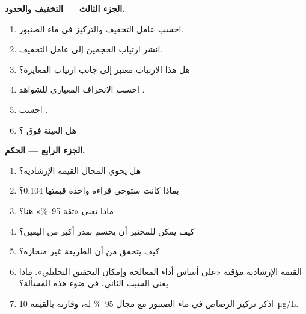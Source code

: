 \begin{problem}
\medskip
\noindent\textbf{الجزء الثالث --- التخفيف والحدود.}
\begin{enumerate}[resume]
  \item احسب عامل التخفيف والتركيز في ماء الصنبور.
  \item انشر ارتياب الحجمين إلى عامل التخفيف.
  \item هل هذا الارتياب معتبر إلى جانب ارتياب المعايرة؟
  \item احسب الانحراف المعياري للشواهد .
  \item احسب .
  \item هل العينة فوق ؟
\end{enumerate}

\medskip
\noindent\textbf{الجزء الرابع --- الحكم.}
\begin{enumerate}[resume]
  \item هل يحوي المجال القيمة الإرشادية؟
  \item بماذا كانت ستوحي قراءة واحدة قيمتها 0.104؟
  \item ماذا تعني «ثقة 95~\%» هنا؟
  \item كيف يمكن للمختبر أن يحسم بقدر أكبر من اليقين؟
  \item كيف يتحقق من أن الطريقة غير منحازة؟
  \item القيمة الإرشادية مؤقتة «على أساس أداء المعالجة وإمكان
        التحقيق التحليلي». ماذا يعني السبب الثاني، في ضوء هذه المسألة؟
  \item اذكر تركيز الرصاص في ماء الصنبور مع مجال 95~\% له، وقارنه بالقيمة
        \qty{10}{\micro g/L}.
\end{enumerate}
\end{problem}
